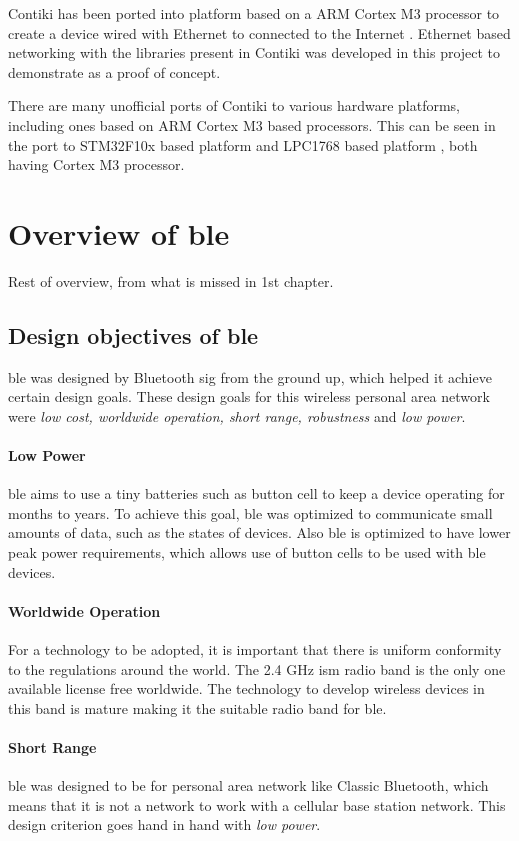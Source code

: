 Contiki has been ported into platform based on a ARM Cortex M3 processor to create a device wired with Ethernet to connected to the Internet \cite{Wilde2013a}. Ethernet based networking with the libraries present in Contiki was developed in this project to demonstrate as a proof of concept.

There are many unofficial ports of Contiki to various hardware platforms, including ones based on ARM Cortex M3 based processors. This can be seen in the port to STM32F10x based platform \cite{Padrah} and LPC1768 based platform \cite{Tanyingyong2013}, both having Cortex M3 processor.



\section{Overview of \acrlong{ble}}
Rest of overview, from what is missed in 1st chapter.

\subsection{Design objectives of \gls{ble}}
\gls{ble} was designed by Bluetooth \gls{sig} from the ground up, which helped it achieve certain design goals. These design goals for this wireless personal area network were \emph{low cost, worldwide operation, short range, robustness} and \emph{low power}\cite{Heydon2012}. 
\paragraph{Low Power} \gls{ble} aims to use a tiny batteries such as button cell to keep a device operating for months to years. To achieve this goal, \gls{ble} was optimized to communicate small amounts of data, such as the states of devices. Also \gls{ble} is optimized to have lower peak power requirements, which allows use of button cells to be used with \gls{ble} devices.
\paragraph{Worldwide Operation}
For a technology to be adopted, it is important that there is uniform conformity to the regulations around the world. The 2.4 \si{\GHz} \gls{ism} radio band is the only one available license free worldwide. The technology to develop wireless devices in this band is mature making it the suitable radio band for \gls{ble}.
\paragraph{Short Range}
\gls{ble} was designed to be for personal area network like Classic Bluetooth, which means that it is not a network to work with a cellular base station network. This design criterion goes hand in hand with \emph{low power}.
